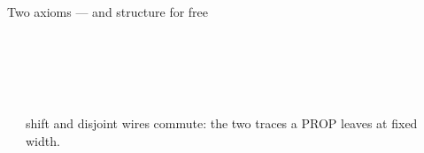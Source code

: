\begin{frame}{Two axioms --- and structure for free}
\begin{columns}[c]
\begin{column}{0.64\textwidth}
\begin{code}
\AgdaOperator{\AgdaInductiveConstructor{[}}\AgdaSpace{}%
\AgdaSpace{}%
\AgdaSpace{}%
\AgdaOperator{\AgdaInductiveConstructor{]ʷ}}\AgdaSpace{}%
\AgdaSpace{}%
\AgdaOperator{\AgdaInductiveConstructor{[}}\AgdaSpace{}%
\AgdaSpace{}%
\AgdaSpace{}%
\AgdaOperator{\AgdaInductiveConstructor{]ʷ}}\<%
\\
%
\>[2]\AgdaSpace{}%
\AgdaSymbol{:}%
\>[273I]\AgdaSymbol{(}\AgdaSpace{}%
\AgdaSymbol{:}\AgdaSpace{}%
\AgdaSpace{}%
\AgdaSymbol{)}\AgdaSpace{}%
\AgdaSymbol{(}\AgdaSpace{}%
\AgdaSymbol{:}\AgdaSpace{}%
\AgdaSpace{}%
\AgdaSymbol{)}\AgdaSpace{}%
\<%
\\
\>[.][@{}l@{}]\<[273I]%
\>[10]\AgdaSymbol{(}\AgdaSpace{}%
\AgdaSymbol{)}\AgdaSpace{}%
\AgdaSpace{}%
\AgdaOperator{\AgdaInductiveConstructor{[}}\AgdaSpace{}%
\AgdaSpace{}%
\AgdaSpace{}%
\AgdaSpace{}%
\AgdaOperator{\AgdaInductiveConstructor{]ʷ}}\AgdaSpace{}%
\AgdaSpace{}%
\AgdaOperator{\AgdaInductiveConstructor{[}}\AgdaSpace{}%
\AgdaSpace{}%
\AgdaSpace{}%
\AgdaOperator{\AgdaInductiveConstructor{]ʷ}}\AgdaSpace{}%
\AgdaOperator{\AgdaDatatype{===}}\AgdaSpace{}%
\AgdaOperator{\AgdaInductiveConstructor{[}}\AgdaSpace{}%
\AgdaSpace{}%
\AgdaSpace{}%
\AgdaOperator{\AgdaInductiveConstructor{]ʷ}}\AgdaSpace{}%
\AgdaSpace{}%
\AgdaOperator{\AgdaInductiveConstructor{[}}\AgdaSpace{}%
\AgdaSpace{}%
\AgdaSpace{}%
\AgdaSpace{}%
\AgdaOperator{\AgdaInductiveConstructor{]ʷ}}\<%
\end{code}
\end{column}
\begin{column}{0.33\textwidth}
\centering
{}\\[3pt]
\\[12pt]
\\[3pt]
\\[14pt]
{\small shift and disjoint wires commute: the two traces a PROP leaves at
fixed width.}
\end{column}
\end{columns}
\end{frame}

